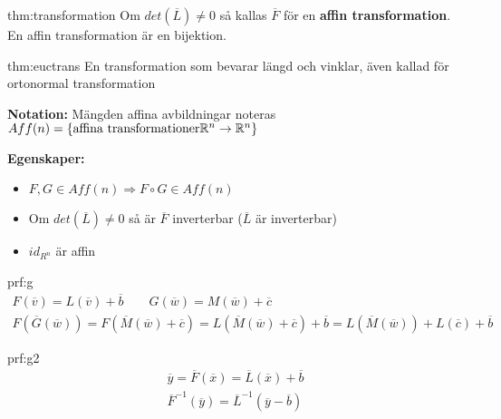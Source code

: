 \par\bigskip
\begin{theo}{thm:transformation}
  Om $det(\overline{L}) \neq 0$ så kallas $\overline{F}$ för en \textbf{affin transformation}. En affin transformation är en bijektion.
\end{theo}
\par\bigskip
\begin{theo}{thm:euctrans}
  En transformation som bevarar längd och vinklar, även kallad för ortonormal transformation
\end{theo}
\par\bigskip
\noindent\textbf{Notation:} Mängden affina avbildningar noteras $Aff(n) = \{\text{affina transformationer} \mathbb{R}^n\to\mathbb{R}^n\}$
\par\bigskip
\noindent\textbf{Egenskaper:}
\begin{itemize}
  \item $F,G\in Aff(n)\Rightarrow F\circ G\in Aff(n)$
  \item Om $det(\overline{L})\neq0$ så är $\overline{F}$ inverterbar ($\overline{L}$ är inverterbar)
  \item $id_{R^n}$ är affin 
\end{itemize}
\par\bigskip
\begin{prf}[Egenskap 1]{prf:g}
  \begin{equation*}
    \begin{gathered}
      F(\overline{v}) = L(\overline{v})+\overline{b}\qquad G(\overline{w}) = M(\overline{w})+\overline{c}\\
      F(\overline{G}(\overline{w})) = F(\overline{M}(\overline{w})+\overline{c})=L(\overline{M}(\overline{w})+\overline{c})+\overline{b} = L(\overline{M}(\overline{w}))+L(\overline{c})+\overline{b}
    \end{gathered}
  \end{equation*}
\end{prf}
\newpage
\begin{prf}[Egenskap 2]{prf:g2}
  \begin{equation*}
    \begin{gathered}
      \overline{y} = \overline{F}(\overline{x}) = \overline{L}(\overline{x})+\overline{b}\\
      \overline{F}^{-1}(\overline{y}) = \overline{L}^{-1}(\overline{y}-\overline{b})
    \end{gathered}
  \end{equation*}
\end{prf}
